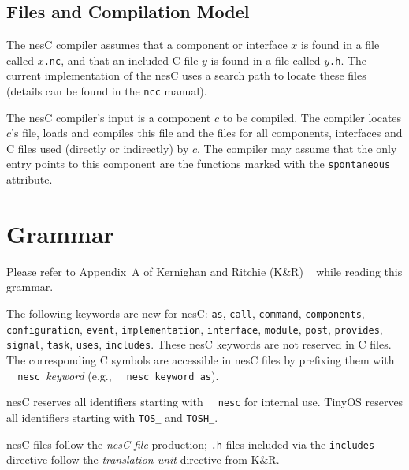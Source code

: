 \documentclass[11pt]{article}
\newcommand{\kw}[1]{{\tt #1}}
\newcommand{\code}[1]{{\tt #1}}
\newcommand{\file}[1]{{\tt #1}}
\newcommand{\nesc}{nesC\xspace}
\begin{document}
\subsection{Files and Compilation Model}
\label{sec:cmodel}

The \nesc compiler assumes that a component or interface $x$ is found
in a file called \file{$x$.nc}, and that an included C file $y$ is
found in a file called \file{$y$.h}. The current implementation of
the \nesc uses a search path to locate these files (details can be
found in the \file{ncc} manual).

The \nesc compiler's input is a component $c$ to be compiled. The compiler
locates $c$'s file, loads and compiles this file and the files for all
components, interfaces and C files used (directly or indirectly) by $c$.
The compiler may assume that the only entry points to this component
are the functions marked with the \code{spontaneous} attribute.

\section{Grammar}
\label{sec:grammar}

Please refer to  Appendix~A of Kernighan and Ritchie (K\&R)
~\cite[pp234--239]{kandr} while reading this grammar.

The following keywords are new for \nesc: \kw{as}, \kw{call}, \kw{command},
\kw{components}, \kw{configuration}, \kw{event}, \kw{implementation},
\kw{interface}, \kw{module}, \kw{post}, \kw{provides}, \kw{signal},
\kw{task}, \kw{uses}, \kw{includes}. These \nesc keywords are not reserved
in C files. The corresponding C symbols are accessible in \nesc files by
prefixing them with \kw{\_\_nesc\_}\emph{keyword} (e.g.,
\kw{\_\_nesc\_keyword\_as}).

\nesc reserves all identifiers starting with \kw{\_\_nesc} for internal
use. TinyOS reserves all identifiers starting with \kw{TOS\_} and
\kw{TOSH\_}.

\nesc files follow the \emph{nesC-file} production; \file{.h} files included
via the \kw{includes} directive follow the \emph{translation-unit}
directive from K\&R. 
\end{document}
